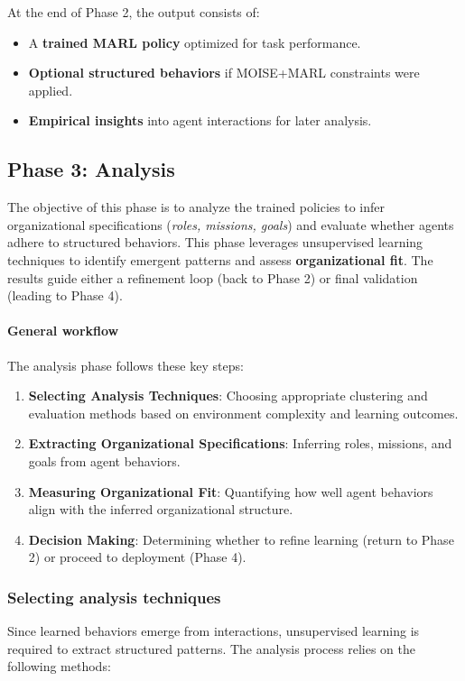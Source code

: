 \documentclass[pdflatex,sn-mathphys-num]{sn-jnl}%
\theoremstyle{thmstyleone}%
\theoremstyle{thmstyletwo}%
\theoremstyle{thmstylethree}%
\begin{document}
At the end of Phase 2, the output consists of:
\begin{itemize}
    \item A \textbf{trained MARL policy} optimized for task performance.
    \item \textbf{Optional structured behaviors} if MOISE+MARL constraints were applied.
    \item \textbf{Empirical insights} into agent interactions for later analysis.
\end{itemize}

\subsection{Phase 3: Analysis}

The objective of this phase is to analyze the trained policies to infer organizational specifications (\textit{roles, missions, goals}) and evaluate whether agents adhere to structured behaviors. This phase leverages unsupervised learning techniques to identify emergent patterns and assess \textbf{organizational fit}. The results guide either a refinement loop (back to Phase 2) or final validation (leading to Phase 4).

\paragraph{\textbf{General workflow}} 
The analysis phase follows these key steps:
\begin{enumerate}
    \item \textbf{Selecting Analysis Techniques}: Choosing appropriate clustering and evaluation methods based on environment complexity and learning outcomes.
    \item \textbf{Extracting Organizational Specifications}: Inferring roles, missions, and goals from agent behaviors.
    \item \textbf{Measuring Organizational Fit}: Quantifying how well agent behaviors align with the inferred organizational structure.
    \item \textbf{Decision Making}: Determining whether to refine learning (return to Phase 2) or proceed to deployment (Phase 4).
\end{enumerate}

\subsubsection{Selecting analysis techniques}
Since learned behaviors emerge from interactions, unsupervised learning is required to extract structured patterns. The analysis process relies on the following methods:
\end{document}
